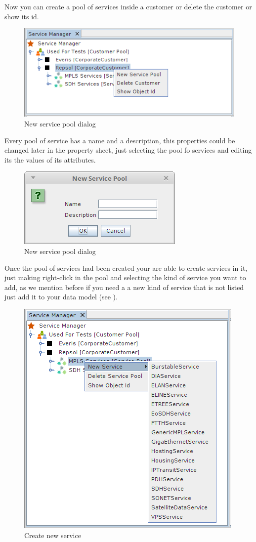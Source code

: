 \documentclass[a4paper]{article}
\begin{document}
    Now you can create a pool of services inside a customer or delete the customer or show its id. 
	\begin{figure}[h!]
		\centering
		\includegraphics[width=0.6\linewidth]{img/sm_customer_actions.png}
		\caption{New service pool dialog}
		\label{fig:sm_customer_actions}
	\end{figure}	

	Every pool of service has a name and a description, this properties could be changed later in the property sheet, just selecting the pool fo services and editing its the values of its attributes.
	\begin{figure}[h!]
		\centering
		\includegraphics[width=0.4\linewidth]{img/sm_new_service_pool.png}
		\caption{New service pool dialog}
		\label{fig:sm_new_service_pool}
	\end{figure}

	\newpage
	Once the pool of services had been created your are able to create services in it, just making right-click in the pool and selecting the kind of service you want to add, as we mention before if you need a a new kind of service that is not listed just add it to your data model (see \textbf{}). 
	\begin{figure}[h!]
		\centering
		\includegraphics[width=0.6\linewidth]{img/sm_create_new_service.png}
		\caption{Create new service}
		\label{fig:sm_create_new_service}
	\end{figure}
	
\end{document}
